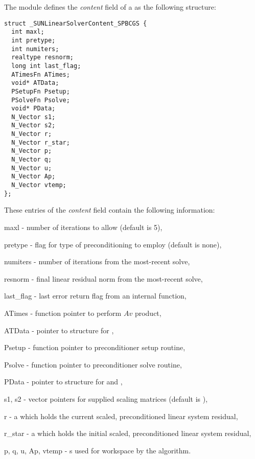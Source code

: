 The {\sunlinsolspbcgs} module defines the \textit{content} field of a
 as the following structure:
\begin{verbatim}
struct _SUNLinearSolverContent_SPBCGS {
  int maxl;
  int pretype;
  int numiters;
  realtype resnorm;
  long int last_flag;
  ATimesFn ATimes;
  void* ATData;
  PSetupFn Psetup;
  PSolveFn Psolve;
  void* PData;
  N_Vector s1;
  N_Vector s2;
  N_Vector r;
  N_Vector r_star;
  N_Vector p;
  N_Vector q;
  N_Vector u;
  N_Vector Ap;
  N_Vector vtemp;
};
\end{verbatim}
These entries of the \emph{content} field contain the following
information:
\begin{args}
  \item[maxl] - number of {\spbcgs} iterations to allow (default is 5),
  \item[pretype] - flag for type of preconditioning to employ
    (default is none),
  \item[numiters] - number of iterations from the most-recent solve,
  \item[resnorm] - final linear residual norm from the most-recent solve,
  \item[last\_flag] - last error return flag from an internal function,
  \item[ATimes] - function pointer to perform $Av$ product,
  \item[ATData] - pointer to structure for ,
  \item[Psetup] - function pointer to preconditioner setup routine,
  \item[Psolve] - function pointer to preconditioner solve routine,
  \item[PData] - pointer to structure for  and ,
  \item[s1, s2] - vector pointers for supplied scaling matrices
    (default is ),
  \item[r] - a {\nvector} which holds the current scaled,
    preconditioned linear system residual,
  \item[r\_star] - a {\nvector} which holds the initial scaled,
    preconditioned linear system residual,
  \item[p, q, u, Ap, vtemp] - {\nvector}s used for workspace by the
    {\spbcgs} algorithm.
\end{args}

